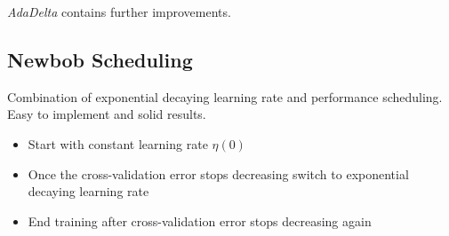 \emph{AdaDelta} contains further improvements.

\subsection{Newbob Scheduling}
Combination of exponential decaying learning rate and performance scheduling. Easy to implement and solid results.
\begin{itemize}
\item Start with constant learning rate $\eta(0)$
\item Once the cross-validation error stops decreasing switch to exponential decaying learning rate
\item End training after cross-validation error stops decreasing again
\end{itemize}
